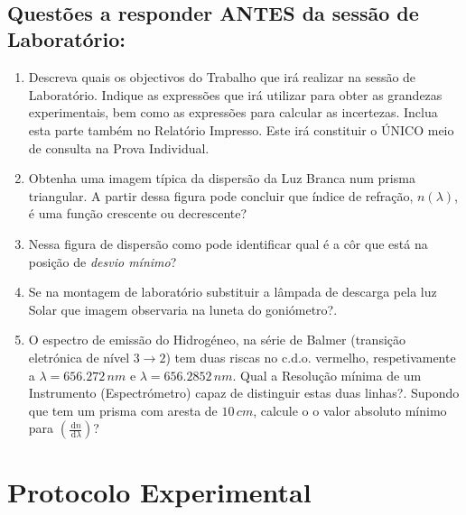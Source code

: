 \documentclass[a4paper,12pt]{article}  %
\newcommand{\ud}{\,\mathrm{d}}
\begin{document}
~
\newpage
\subsection{\sf Questões a responder ANTES da sessão de Laboratório:}
\begin{enumerate}
\item Descreva quais os objectivos do Trabalho que irá realizar na sessão de Laboratório. Indique as expressões que irá utilizar para obter as grandezas experimentais, bem como as expressões para calcular as incertezas. Inclua esta parte também no Relatório Impresso. Este irá constituir o ÚNICO meio de consulta na Prova Individual.
\item Obtenha uma imagem típica da dispersão da Luz Branca num prisma triangular. A partir dessa figura pode concluir que índice de refração, $n(\lambda)$, é uma função crescente ou decrescente?
\item Nessa figura de dispersão como pode identificar qual é a côr que está na posição de \emph{desvio mínimo}?
\item Se na montagem de laboratório substituir a lâmpada de descarga pela luz Solar que imagem observaria na luneta do goniómetro?. 
\item O espectro de emissão do Hidrogéneo, na série de Balmer (transição eletrónica de nível $3 \to 2$) tem duas riscas no c.d.o. vermelho, respetivamente a $\lambda = 656.272\, nm$ e $\lambda = 656.2852\,nm$.
Qual a Resolução mínima de um Instrumento (Espectrómetro) capaz de distinguir estas duas linhas?. Supondo que tem um prisma com aresta de $10\,cm$, calcule o 
o valor absoluto mínimo para $\left(\frac{\ud n}{\ud \lambda} \right)$?
\end{enumerate}


\section{\sf Protocolo Experimental}
\end{document}
